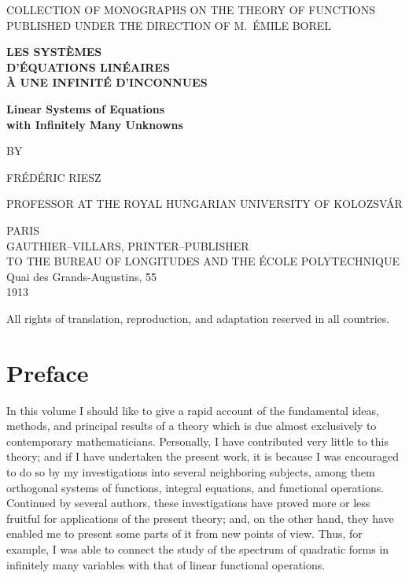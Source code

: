 \documentclass[
  paper=b5,
  fontsize=13pt,
  twoside=true,
  open=any,
  bookmarkpackage=false,
  chapterprefix=true,
  headings=normal
]{scrbook}
\theoremstyle{definition}
\begin{document}
\setcounter{page}{1}

\begin{titlepage}
  \thispagestyle{empty}
  \centering
  {\small
    COLLECTION OF MONOGRAPHS ON THE THEORY OF FUNCTIONS\\
    PUBLISHED UNDER THE DIRECTION OF M.~ÉMILE BOREL
  \par}
  \vspace{2.2cm}
  {\bfseries\LARGE
    LES SYSTÈMES\\[0.35em]
    D'ÉQUATIONS LINÉAIRES\\[0.35em]
    À UNE INFINITÉ D'INCONNUES
  \par}
  \vspace{1.1cm}
  {\bfseries\Large
    Linear Systems of Equations\\[0.25em]
    with Infinitely Many Unknowns
  \par}
  \vspace{1.6cm}
  {\small BY\par}
  \vspace{0.2cm}
  {\large FRÉDÉRIC RIESZ\par}
  \vspace{0.35cm}
  {\small
    PROFESSOR AT THE ROYAL HUNGARIAN UNIVERSITY OF KOLOZSVÁR
  \par}
  \vfill
  {\small
    PARIS\\
    GAUTHIER--VILLARS, PRINTER--PUBLISHER\\
    TO THE BUREAU OF LONGITUDES AND THE ÉCOLE POLYTECHNIQUE\\
    Quai des Grands-Augustins, 55\\[0.45em]
    1913
  \par}
\end{titlepage}

\clearpage
\thispagestyle{fancy}
\vspace*{\fill}
\begin{center}
  All rights of translation, reproduction, and adaptation reserved in all countries.
\end{center}
\vspace*{\fill}

\chapter*{Preface}

In this volume I should like to give a rapid account of the fundamental ideas,
methods, and principal results of a theory which is due almost exclusively to
contemporary mathematicians. Personally, I have contributed very little to this
theory; and if I have undertaken the present work, it is because I was encouraged
to do so by my investigations into several neighboring subjects, among them
orthogonal systems of functions, integral equations, and functional operations.
Continued by several authors, these investigations have proved more or less
fruitful for applications of the present theory; and, on the other hand, they have
enabled me to present some parts of it from new points of view. Thus, for example,
I was able to connect the study of the spectrum of quadratic forms in infinitely
many variables with that of linear functional operations.
\end{document}
